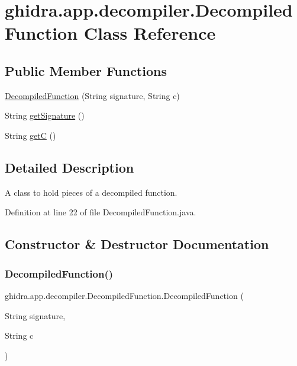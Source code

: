 \hypertarget{classghidra_1_1app_1_1decompiler_1_1_decompiled_function}{}\section{ghidra.\+app.\+decompiler.\+Decompiled\+Function Class Reference}
\label{classghidra_1_1app_1_1decompiler_1_1_decompiled_function}
\subsection*{Public Member Functions}
\begin{DoxyCompactItemize}
\item 
\mbox{\hyperlink{classghidra_1_1app_1_1decompiler_1_1_decompiled_function_a479b6a99aeaf39f30e621b7191aa7f8d}{Decompiled\+Function}} (String signature, String c)
\item 
String \mbox{\hyperlink{classghidra_1_1app_1_1decompiler_1_1_decompiled_function_a38bc736bc8898d62849f4c53be63492d}{get\+Signature}} ()
\item 
String \mbox{\hyperlink{classghidra_1_1app_1_1decompiler_1_1_decompiled_function_a43056f99e19bc160c0fb94c2b7e26049}{getC}} ()
\end{DoxyCompactItemize}


\subsection{Detailed Description}
A class to hold pieces of a decompiled function. 

Definition at line 22 of file Decompiled\+Function.\+java.



\subsection{Constructor \& Destructor Documentation}
\mbox{\label{classghidra_1_1app_1_1decompiler_1_1_decompiled_function_a479b6a99aeaf39f30e621b7191aa7f8d}} 
\subsubsection{\texorpdfstring{DecompiledFunction()}{DecompiledFunction()}}
{\footnotesize\ttfamily ghidra.\+app.\+decompiler.\+Decompiled\+Function.\+Decompiled\+Function (\begin{DoxyParamCaption}\item[{String}]{signature,  }\item[{String}]{c }\end{DoxyParamCaption})\hspace{0.3cm}{\ttfamily [inline]}}

